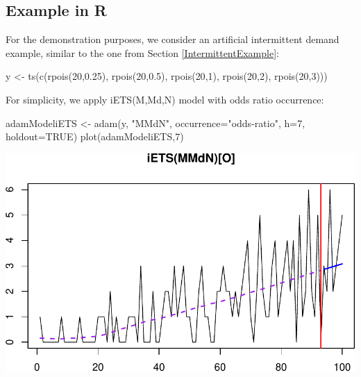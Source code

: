 \documentclass[
]{book}
\newenvironment{Shaded}{\begin{snugshade}}{\end{snugshade}}
\newcommand{\AttributeTok}[1]{\textcolor[rgb]{0.77,0.63,0.00}{#1}}
\newcommand{\ConstantTok}[1]{\textcolor[rgb]{0.00,0.00,0.00}{#1}}
\newcommand{\DecValTok}[1]{\textcolor[rgb]{0.00,0.00,0.81}{#1}}
\newcommand{\FloatTok}[1]{\textcolor[rgb]{0.00,0.00,0.81}{#1}}
\newcommand{\FunctionTok}[1]{\textcolor[rgb]{0.00,0.00,0.00}{#1}}
\newcommand{\NormalTok}[1]{#1}
\newcommand{\OtherTok}[1]{\textcolor[rgb]{0.56,0.35,0.01}{#1}}
\newcommand{\StringTok}[1]{\textcolor[rgb]{0.31,0.60,0.02}{#1}}
\theoremstyle{definition}
\theoremstyle{definition}
\theoremstyle{definition}
\theoremstyle{definition}
\theoremstyle{remark}
\begin{document}
\hypertarget{forecastingADAMOtherExample}{%
\subsection{Example in R}\label{forecastingADAMOtherExample}}

For the demonstration purposes, we consider an artificial intermittent demand example, similar to the one from Section \ref{IntermittentExample}:

\begin{Shaded}
\begin{Highlighting}[]
\NormalTok{y }\OtherTok{\textless{}{-}} \FunctionTok{ts}\NormalTok{(}\FunctionTok{c}\NormalTok{(}\FunctionTok{rpois}\NormalTok{(}\DecValTok{20}\NormalTok{,}\FloatTok{0.25}\NormalTok{), }\FunctionTok{rpois}\NormalTok{(}\DecValTok{20}\NormalTok{,}\FloatTok{0.5}\NormalTok{), }\FunctionTok{rpois}\NormalTok{(}\DecValTok{20}\NormalTok{,}\DecValTok{1}\NormalTok{),}
          \FunctionTok{rpois}\NormalTok{(}\DecValTok{20}\NormalTok{,}\DecValTok{2}\NormalTok{), }\FunctionTok{rpois}\NormalTok{(}\DecValTok{20}\NormalTok{,}\DecValTok{3}\NormalTok{)))}
\end{Highlighting}
\end{Shaded}

For simplicity, we apply iETS(M,Md,N) model with odds ratio occurrence:

\begin{Shaded}
\begin{Highlighting}[]
\NormalTok{adamModeliETS }\OtherTok{\textless{}{-}} \FunctionTok{adam}\NormalTok{(y, }\StringTok{"MMdN"}\NormalTok{, }\AttributeTok{occurrence=}\StringTok{"odds{-}ratio"}\NormalTok{,}
                      \AttributeTok{h=}\DecValTok{7}\NormalTok{, }\AttributeTok{holdout=}\ConstantTok{TRUE}\NormalTok{)}
\FunctionTok{plot}\NormalTok{(adamModeliETS,}\DecValTok{7}\NormalTok{)}
\end{Highlighting}
\end{Shaded}

\includegraphics{Svetunkov--2022----ADAM_files/figure-latex/unnamed-chunk-144-1.pdf}
\end{document}
